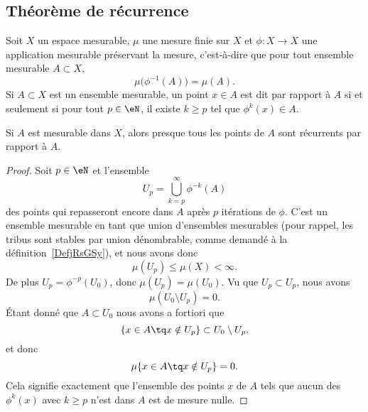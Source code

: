 \subsection{Théorème de récurrence}

Soit \( X\) un espace mesurable, \( \mu\) une mesure finie sur \( X\) et \( \phi\colon X\to X\) une application mesurable préservant la mesure, c'est-à-dire que pour tout ensemble mesurable \( A\subset X\),
\begin{equation}
    \mu\big( \phi^{-1}(A) \big)=\mu(A).
\end{equation}
Si \( A\subset X\) est un ensemble mesurable, un point \( x\in A\) est dit  par rapport à \( A\) si et seulement si pour tout \( p\in \eN\), il existe \( k\geq p\) tel que \( \phi^k(x)\in A\).

\begin{theorem}     \label{ThoYnLNEL}
    Si \( A\) est mesurable dans \( X\), alors presque tous les points de \( A\) sont récurrents par rapport à \( A\).
\end{theorem}

\begin{proof}
    Soit \( p\in \eN\) et l'ensemble
    \begin{equation}
        U_p=\bigcup_{k=p}^{\infty}\phi^{-k}(A)
    \end{equation}
    des points qui repasseront encore dans \( A\) après \( p\) itérations  de \( \phi\). C'est un ensemble mesurable en tant que union d'ensembles mesurables (pour rappel, les tribus sont stables par union dénombrable, comme demandé à la définition~\ref{DefjRsGSy}), et nous avons donc
    \begin{equation}
        \mu(U_p)\leq \mu(X)<\infty.
    \end{equation}
    De plus \( U_p=\phi^{-p}(U_0)\), donc \( \mu(U_p)=\mu(U_0)\). Vu que \( U_p\subset U_p\), nous avons
    \begin{equation}
        \mu(U_0\setminus U_p)=0.
    \end{equation}
    Étant donné que \( A\subset U_0\) nous avons a fortiori que
    \begin{equation}
        \{ x\in A\tq x\notin U_p \}\subset U_0\setminus U_p,
    \end{equation}
    et donc
    \begin{equation}
        \mu\{ x\in A\tq x\notin U_p \}=0.
    \end{equation}
    Cela signifie exactement que l'ensemble des points \( x\) de \( A\) tels que aucun des \( \phi^k(x)\) avec \( k\geq p\) n'est dans \( A\) est de mesure nulle.
\end{proof}



